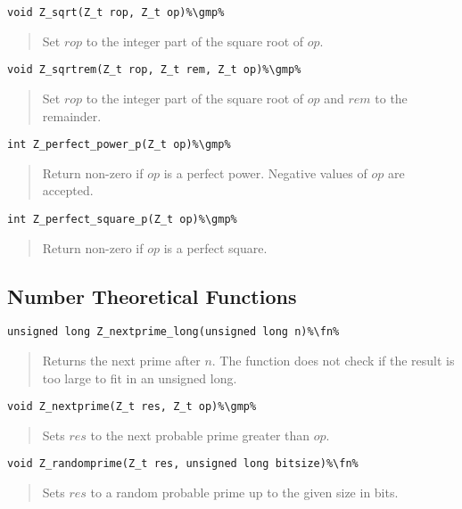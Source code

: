 \documentclass[a4paper,10pt]{article}
\newcommand{\fn}{\hfill[Function]}
\newcommand{\gmp}{\hfill[GMP]}
\begin{document}
\begin{lstlisting}
void Z_sqrt(Z_t rop, Z_t op)%\gmp%
\end{lstlisting}
\begin{quote}Set $rop$ to the integer part of the square root of $op$.\end{quote}

\begin{lstlisting}
void Z_sqrtrem(Z_t rop, Z_t rem, Z_t op)%\gmp%
\end{lstlisting}
\begin{quote}Set $rop$ to the integer part of the square root of $op$ and $rem$ to the remainder.\end{quote}

\begin{lstlisting}
int Z_perfect_power_p(Z_t op)%\gmp%
\end{lstlisting}
\begin{quote}Return non-zero if $op$ is a perfect power. Negative values of $op$ are accepted.\end{quote}

\begin{lstlisting}
int Z_perfect_square_p(Z_t op)%\gmp%
\end{lstlisting}
\begin{quote}Return non-zero if $op$ is a perfect square.\end{quote}

\subsection{Number Theoretical Functions}
\begin{lstlisting}
unsigned long Z_nextprime_long(unsigned long n)%\fn%
\end{lstlisting}
\begin{quote}Returns the next prime after $n$. The function does not check if the result is too large to fit in an unsigned long.\end{quote}

\begin{lstlisting}
void Z_nextprime(Z_t res, Z_t op)%\gmp%
\end{lstlisting}
\begin{quote}Sets $res$ to the next probable prime greater than $op$.\end{quote}

\begin{lstlisting}
void Z_randomprime(Z_t res, unsigned long bitsize)%\fn%
\end{lstlisting}
\begin{quote}Sets $res$ to a random probable prime up to the given size in bits.\end{quote}
\end{document}
